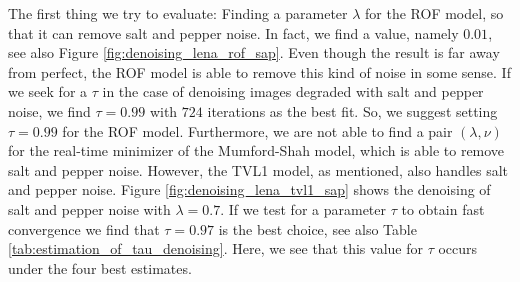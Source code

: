 \documentclass[abstracton]{scrreprt}
\begin{document}
            The first thing we try to evaluate: Finding a parameter $\lambda$ for the ROF model, so that it can remove salt and pepper noise. In fact, we find a value, namely $0.01$, see also Figure \ref{fig:denoising_lena_rof_sap}. Even though the result is far away from perfect, the ROF model is able to remove this kind of noise in some sense. If we seek for a $\tau$ in the case of denoising images degraded with salt and pepper noise, we find $\tau = 0.99$ with $724$ iterations as the best fit. So, we suggest setting $\tau = 0.99$ for the ROF model. Furthermore, we are not able to find a pair $(\lambda, \nu)$ for the real-time minimizer of the Mumford-Shah model, which is able to remove salt and pepper noise. However, the TVL1 model, as mentioned, also handles salt and pepper noise. Figure \ref{fig:denoising_lena_tvl1_sap} shows the denoising of salt and pepper noise with $\lambda = 0.7$. If we test for a parameter $\tau$ to obtain fast convergence we find that $\tau = 0.97$ is the best choice, see also Table \ref{tab:estimation_of_tau_denoising}. Here, we see that this value for $\tau$ occurs under the four best estimates.\\
\end{document}
